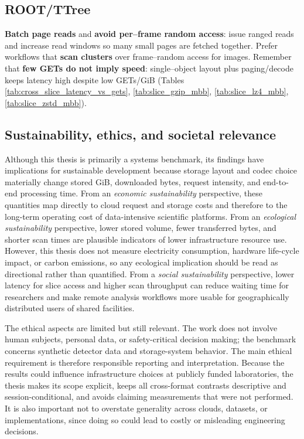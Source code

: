 \documentclass[nomenclature, english, bibtex]{kththesis}
\numberwithin{listing}{chapter}
\begin{document}
\subsection{\texorpdfstring{\gls{ROOT}/\gls{TTree}}{ROOT/TTree}}
\textbf{Batch page reads} and \textbf{avoid per–frame random access}: issue ranged reads and increase read windows so many small pages are fetched together. Prefer workflows that \textbf{scan clusters} over frame–random access for images. Remember that \textbf{few GETs do not imply speed}: single–object layout plus paging/decode keeps latency high despite low GETs/GiB (Tables \ref{tab:cross_slice_latency_vs_gets}, \ref{tab:slice_gzip_mbb}, \ref{tab:slice_lz4_mbb}, \ref{tab:slice_zstd_mbb}).

\subsection{Sustainability, ethics, and societal relevance}
Although this thesis is primarily a systems benchmark, its findings have implications for sustainable development because storage layout and codec choice materially change stored GiB, downloaded bytes, request intensity, and end-to-end processing time. From an \emph{economic sustainability} perspective, these quantities map directly to cloud request and storage costs and therefore to the long-term operating cost of data-intensive scientific platforms. From an \emph{ecological sustainability} perspective, lower stored volume, fewer transferred bytes, and shorter scan times are plausible indicators of lower infrastructure resource use. However, this thesis does not measure electricity consumption, hardware life-cycle impact, or carbon emissions, so any ecological implication should be read as directional rather than quantified. From a \emph{social sustainability} perspective, lower latency for slice access and higher scan throughput can reduce waiting time for researchers and make remote analysis workflows more usable for geographically distributed users of shared facilities.

The ethical aspects are limited but still relevant. The work does not involve human subjects, personal data, or safety-critical decision making; the benchmark concerns synthetic detector data and storage-system behavior. The main ethical requirement is therefore responsible reporting and interpretation. Because the results could influence infrastructure choices at publicly funded laboratories, the thesis makes its scope explicit, keeps all cross-format contrasts descriptive and session-conditional, and avoids claiming measurements that were not performed. It is also important not to overstate generality across clouds, datasets, or implementations, since doing so could lead to costly or misleading engineering decisions.
\end{document}
